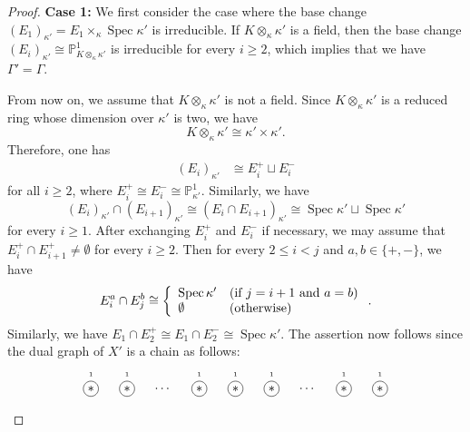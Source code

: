 \documentclass[12pt]{amsart}
\def\ge{\geqslant}
\def\le{\leqslant}
\def\Spec{\operatorname{Spec}}
\newcommand{\PP}{\mathbb{P}}
\theoremstyle{plain}
\theoremstyle{definition}
\theoremstyle{remark}
\newtheorem{defn and notation}[thm]{Definition and Notation}
\theoremstyle{plain}
\numberwithin{equation}{thm}
\begin{document}
\begin{proof}
\textbf{Case 1:} We first consider the case where the base change $(E_1)_{\kappa'} = E_1 \times_{\kappa} \Spec \kappa'$ is irreducible.
If $K \otimes_{\kappa} \kappa'$ is a field, then the base change $(E_i)_{\kappa'} \cong \PP^1_{K \otimes_{\kappa} \kappa'}$ is irreducible for every $i \ge 2$, which implies that we have $\Gamma' = \Gamma$.

From now on, we assume that $K \otimes_{\kappa} \kappa'$ is not a field.
Since $K \otimes_{\kappa} \kappa'$ is a reduced ring whose dimension over $\kappa'$ is two, we have 
\[
K \otimes_{\kappa} \kappa' \cong \kappa' \times \kappa'.
\]
Therefore, one has  
\begin{align*}
    (E_i)_{\kappa'} & \cong E_i^{+} \sqcup E_i^{-}
\end{align*}
for all $i \ge 2$, where $E_i^+ \cong E_i^- \cong \PP^1_{\kappa'}$.
Similarly, we have
\[
(E_i)_{\kappa'} \cap (E_{i+1})_{\kappa'} \cong (E_i \cap E_{i+1})_{\kappa'} \cong\Spec \kappa' \sqcup \Spec \kappa'
\]
for every $i \ge 1$.
After exchanging $E_i^+$ and $E_i^-$ if necessary, we may assume that $E_i^+ \cap E_{i+1}^+ \neq \emptyset$ for every $i \ge 2$.
Then for every $2 \le i < j$ and $a,b \in \{+,-\}$, we have
\begin{align}\label{eq:intersection1}
E_i^a \cap E_j^b \cong \left\{\begin{array}{ll} 
 \Spec \kappa' & \textup{(if $j=i+1$ and $a=b$)} \\
   \emptyset & \textup{(otherwise)}
\end{array}\right. .
\end{align}
Similarly, we have $E_1 \cap E_2^+ \cong E_1 \cap E_2^- \cong \Spec \kappa'$.
The assertion now follows since the dual graph of $X'$ is a chain as follows:
\[
\begin{tikzpicture}
\node[draw, shape=circle, inner sep=1.8pt] (-E_n) at (-2,0){$*$};
\node[draw, shape=circle, inner sep=1.8pt] (-E_{n-1}) at (-1,0){$*$};
\draw node (dot2) at (0,0){$\cdots$};
\node[draw, shape=circle, inner sep=1.8pt] (E1) at (1,0){$*$};
\node[draw, shape=circle, inner sep=1.8pt] (E2) at (2,0){$*$};
\node[draw, shape=circle, inner sep=1.8pt] (E3) at (3,0){$*$};
\draw node (dot) at (4,0){$\cdots$};
\node[draw, shape=circle, inner sep=1.8pt] (E_{n-1}) at (5,0){$*$};
\node[draw, shape=circle, inner sep=1.8pt] (E_n) at (6,0){$*$};

\draw[shift={(0,0.4)}] (-2,0) node{\tiny $1$};
\draw[shift={(0,0.4)}] (-1,0) node{\tiny $1$};
\draw[shift={(0,0.4)}] (1,0) node{\tiny $1$};
\draw[shift={(0,0.4)}] (2,0) node{\tiny $1$};
\draw[shift={(0,0.4)}] (3,0) node{\tiny $1$};
\draw[shift={(0,0.4)}] (4,0) node{\tiny ${}$};
\draw[shift={(0,0.4)}] (5,0) node{\tiny $1$};
\draw[shift={(0,0.4)}] (6,0) node{\tiny $1$};


\end{tikzpicture}\]
\end{proof}
\end{document}
